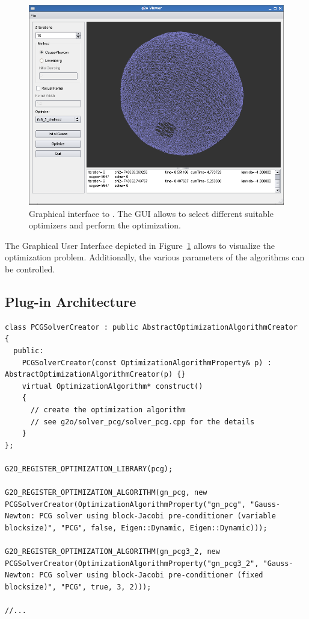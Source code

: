 \documentclass[a4paper]{article}
\begin{document}
\begin{figure}
  \centering
  \includegraphics[width=0.7\columnwidth]{pics/viewer}
  \caption{Graphical interface to \gopt. The GUI allows to select
  different suitable optimizers and perform the optimization.}
  \label{fig:viewer}
\end{figure}

The Graphical User Interface depicted in Figure~\ref{fig:viewer} allows
to visualize the optimization problem. Additionally, the various
parameters of the algorithms can be controlled.

\subsection{Plug-in Architecture}

\begin{lstlisting}[float,label=lst:initsolvers,caption=Registering
  solvers by a constructor from a library]
class PCGSolverCreator : public AbstractOptimizationAlgorithmCreator
{
  public:
    PCGSolverCreator(const OptimizationAlgorithmProperty& p) : AbstractOptimizationAlgorithmCreator(p) {}
    virtual OptimizationAlgorithm* construct()
    {
      // create the optimization algorithm
      // see g2o/solver_pcg/solver_pcg.cpp for the details
    }
};

G2O_REGISTER_OPTIMIZATION_LIBRARY(pcg);

G2O_REGISTER_OPTIMIZATION_ALGORITHM(gn_pcg, new PCGSolverCreator(OptimizationAlgorithmProperty("gn_pcg", "Gauss-Newton: PCG solver using block-Jacobi pre-conditioner (variable blocksize)", "PCG", false, Eigen::Dynamic, Eigen::Dynamic)));

G2O_REGISTER_OPTIMIZATION_ALGORITHM(gn_pcg3_2, new PCGSolverCreator(OptimizationAlgorithmProperty("gn_pcg3_2", "Gauss-Newton: PCG solver using block-Jacobi pre-conditioner (fixed blocksize)", "PCG", true, 3, 2)));

//...
\end{lstlisting}
\end{document}
